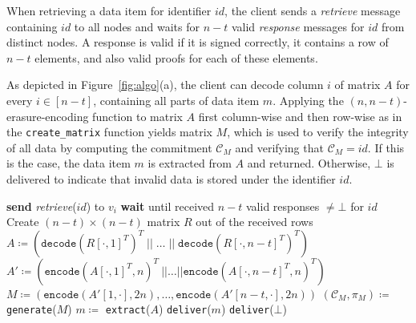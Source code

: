 \documentclass[sigconf,screen]{acmart}
\begin{document}
When retrieving a data item for identifier $id$, the client sends a \emph{retrieve} message containing $id$ to all nodes and waits for $n-t$ valid \emph{response} messages for $id$ from distinct nodes. 
A response is valid if it is signed correctly, it contains a row of $n-t$ elements, and also valid proofs for each of these elements.

As depicted in Figure~\ref{fig:algo}(a), the client can decode column $i$ of matrix $A$ for every $i\in[n-t]$, containing all parts of data item $m$.
Applying the $(n, n-t)$-erasure-encoding function to matrix $A$ first column-wise and then row-wise as in the \texttt{create\_matrix} function yields matrix $M$, which is used to verify the integrity of all data by computing the commitment $\mathcal{C}_M$ and verifying that $\mathcal{C}_M = id$. If this is the case, the data item $m$ is extracted from $A$ and returned. Otherwise, $\bot$ is delivered to indicate that invalid data is stored under the identifier $id$.


\begin{algorithm}[t]
\begin{algorithmic}[1]
\small
\caption{Retrieval at client $c$ for identifier $id$.}
    \label{algo:client_retrieve}
\State \textbf{send} \emph{retrieve}($id$) to $v_i$
\EndFor
\State \textbf{wait} until received $n-t$ valid responses $\neq \bot$ for $id$
\State Create $(n-t) \times (n-t)$ matrix $R$ out of the received rows
\State $A \coloneqq (\texttt{decode}(R[\cdot, 1]^T)^T \;||\; \ldots \;||\; \texttt{decode}(R[\cdot, n-t]^T)^T)$
\State $A' \coloneqq (\texttt{encode}(A[\cdot, 1]^T, n)^T ~|| \ldots || \texttt{encode}(A[\cdot, n-t]^T, n)^T)$
\State $M \coloneqq (\texttt{encode}(A'[1,\cdot],2n), \ldots, \texttt{encode}(A'[n-t,\cdot],2n))$
\State $(\mathcal{C}_M, \pi_M) \coloneqq$ \texttt{generate}($M$)
\State $m \coloneqq$ \texttt{extract}($A$)
\State \texttt{deliver}($m$)
\Else
\State \texttt{deliver}($\bot$)
\EndIf
\end{algorithmic}
\end{algorithm}
\end{document}
